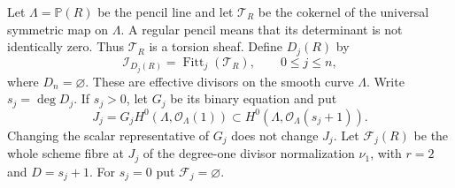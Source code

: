 \documentclass[11pt,reqno]{amsart}
\numberwithin{equation}{section}
\theoremstyle{definition}\newtheorem{definition}[theorem]{Definition}
\theoremstyle{remark}\newtheorem{remark}[theorem]{Remark}
\newcommand{\Pj}{\mathbb P}\newcommand{\A}{\mathbb A}
\newcommand{\OO}{\mathcal O}\newcommand{\II}{\mathcal I}
\DeclareMathOperator{\Fitt}{Fitt}\DeclareMathOperator{\Ann}{Ann}
\begin{document}
Let $\Lambda=\Pj(R)$ be the pencil line and let
$\mathcal T_R$ be the cokernel of the universal symmetric map on
$\Lambda$. A regular pencil means that its determinant is not
identically zero. Thus $\mathcal T_R$ is a torsion sheaf. Define
$D_j(R)$ by
\begin{equation}\label{eq:spectral-Fitting-v154}
 \II_{D_j(R)}=\Fitt_j(\mathcal T_R),\qquad 0\leq j\leq n,
\end{equation}
where $D_n=\varnothing$. These are effective divisors on the smooth
curve $\Lambda$. Write $s_j=\deg D_j$. If $s_j>0$, let $G_j$ be
its binary equation and put
\[
 J_j=G_j H^0(\Lambda,\OO_\Lambda(1))
       \subset H^0(\Lambda,\OO_\Lambda(s_j+1)).
\]
Changing the scalar representative of $G_j$ does not change $J_j$.
Let $\mathcal F_j(R)$ be the whole scheme fibre at $J_j$ of the
degree-one divisor normalization $\nu_1$, with $r=2$ and $D=s_j+1$.
For $s_j=0$ put $\mathcal F_j=\varnothing$.
\end{document}
